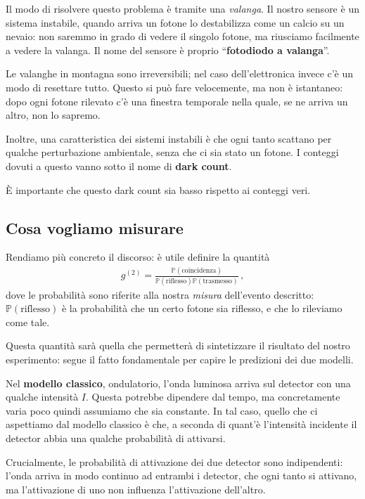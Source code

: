 \documentclass{article}
\begin{document}
Il modo di risolvere questo problema è tramite una \emph{valanga}.
Il nostro sensore è un sistema instabile, quando arriva un fotone lo destabilizza come un calcio su un nevaio: non saremmo in grado di vedere il singolo fotone, ma riusciamo facilmente a vedere la valanga.
Il nome del sensore è proprio ``\textbf{fotodiodo a valanga}''.

Le valanghe in montagna sono irreversibili; nel caso dell'elettronica invece c'è un modo di resettare tutto.
Questo si può fare velocemente, ma non è istantaneo: dopo ogni fotone rilevato c'è una finestra temporale nella quale, se ne arriva un altro, non lo sapremo. 

Inoltre, una caratteristica dei sistemi instabili è che ogni tanto scattano per qualche perturbazione ambientale, senza che ci sia stato un fotone. 
I conteggi dovuti a questo vanno sotto il nome di \textbf{dark count}.

È importante che questo dark count sia basso rispetto ai conteggi veri.

\subsection{Cosa vogliamo misurare}

Rendiamo più concreto il discorso: è utile definire la quantità 
%
\begin{align}
g^{(2)} = \frac{\mathbb{P}(\text{coincidenza})}{\mathbb{P}(\text{riflesso})\mathbb{P}(\text{trasmesso})}
\,,
\end{align}
%
dove le probabilità sono riferite alla nostra \emph{misura} dell'evento descritto: \(\mathbb{P} (\text{riflesso})\) è la probabilità che un certo fotone sia riflesso, e che lo rileviamo come tale.


Questa quantità sarà quella che permetterà di sintetizzare il risultato del nostro esperimento: segue il fatto fondamentale per capire le predizioni dei due modelli. 

Nel \textbf{modello classico}, ondulatorio, l'onda luminosa arriva sul detector con una qualche intensità \(I\). Questa potrebbe dipendere dal tempo, ma concretamente varia poco quindi assumiamo che sia constante.
In tal caso, quello che ci aspettiamo dal modello classico è che, a seconda di quant'è l'intensità incidente il detector abbia una qualche probabilità di attivarsi. 

Crucialmente, le probabilità di attivazione dei due detector sono indipendenti: l'onda arriva in modo continuo ad entrambi i detector, che ogni tanto si attivano, ma l'attivazione di uno non influenza l'attivazione dell'altro. 
\end{document}
